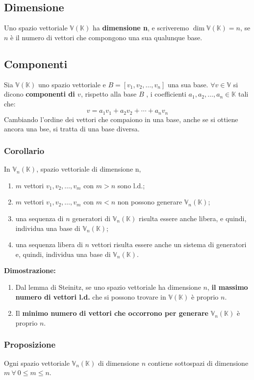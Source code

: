 \documentclass{article}
\newcommand{\V}{\mathbb{V} (\mathbb{K})}
\newcommand{\s}[2]{#1_1, #1_2, \ldots, #1_{#2}}
\newcommand{\Vx}[1]{\mathbb{V}_#1 (\mathbb{K})}
\begin{document}
\subsection{Dimensione}
Uno spazio vettoriale $\V$ ha \textbf{dimensione n}, e scriveremo $\dim\V = n$, se $n$ è il numero di vettori che compongono una sua qualunque base.

\subsection{Componenti}
Sia $\V$ uno spazio vettoriale e $B = [\s{v}{n}]$ una sua base. $\forall v \in \mathbb V$ si dicono \textbf{componenti di $v$}, rispetto alla base $B$
, i coefficienti $a_1, a_2,\ldots,a_n \in \mathbb K$ tali che:
\[
    v = a_1 v_1+a_2 v_2 +\cdots+a_n v_n
\]
Cambiando l'ordine dei vettori che compaiono in una base, anche se si ottiene ancora una bse, si tratta di una base diversa.

\subsubsection{Corollario}
In $\Vx{n}$, spazio vettoriale di dimensione n,
\begin{enumerate}
    \item $m$ vettori $\s{v}{m}$ con $m > n$ sono l.d.;
    \item $m$ vettori $\s{v}{m}$ con $m < n$ non possono generare $\Vx{n}$;
    \item una sequenza di $n$ generatori di $\Vx{n}$ risulta essere anche libera, e quindi, individua una base di $\Vx{n}$;
    \item una sequenza libera di $n$ vettori risulta essere anche un sistema di generatori e, quindi, individua una base di $\Vx{n}$.
\end{enumerate}
\textbf{Dimostrazione:}
\begin{enumerate}
    \item Dal lemma di Steinitz, se uno spazio vettoriale ha dimensione $n$, \textbf{il massimo numero di vettori l.d.} che si possono trovare in $\V$ è proprio $n$.
    \item Il \textbf{minimo numero di vettori che occorrono per generare} $\Vx{n}$ è proprio $n$.
\end{enumerate}

\subsubsection{Proposizione}
Ogni spazio vettoriale $\Vx{n}$ di dimensione $n$ contiene sottospazi di dimensione $m \ \forall \ 0\leq m\leq n$.
\end{document}

